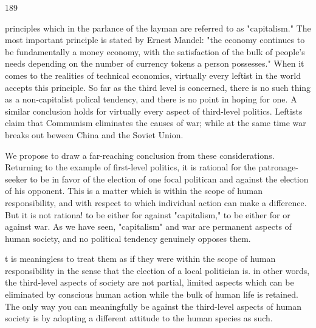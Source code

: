 \documentclass[10pt,twoside]{memoir}
\begin{document}
\begin{enumerate}
{\begin{enumerate}
\begin{sysrules}
\begin{sysrules}
\begin{sysrules}
\begin{sysrules}
{\begin{enumerate}
{{{{{{{{189 


principles which in the parlance of the layman are referred to as 
"capitalism." The most important principle is stated by Ernest Mandel: "the 
economy continues to be fundamentally a money economy, with the 
satisfaction of the bulk of people's needs depending on the number of 
currency tokens a person possesses." When it comes to the realities of 
technical economics, virtually every leftist in the world accepts this 
principle. So far as the third level is concerned, there is no such thing as a 
non-capitalist polical tendency, and there is no point in hoping for one. A 
similar conclusion holds for virtually every aspect of third-level politics. 
Leftists claim that Communism eliminates the causes of war; while at the 
same time war breaks out beween China and the Soviet Union. 

We propose to draw a far-reaching conclusion from these 
considerations. Returning to the example of first-level politics, it is rational 
for the patronage-seeker to be in favor of the election of one focal politican 
and against the election of his opponent. This is a matter which is within the 
scope of human responsibility, and with respect to which individual action 
can make a difference. But it is not rationa! to be either for against 
"capitalism," to be either for or against war. As we have seen, "capitalism" 
and war are permanent aspects of human society, and no political tendency 
genuinely opposes them. {t is meaningless to treat them as if they were 
within the scope of human responsibility in the sense that the election of a 
local politician is. in other words, the third-level aspects of society are not 
partial, limited aspects which can be eliminated by conscious human action 
while the bulk of human life is retained. The only way you can meaningfully 
be against the third-level aspects of human society is by adopting a different 
attitude to the human species as such. 

}}}}}}}}}
\end{enumerate}}
\end{sysrules}
\end{sysrules}
\end{sysrules}
\end{sysrules}
\end{enumerate}}
\end{enumerate}
\end{document}
